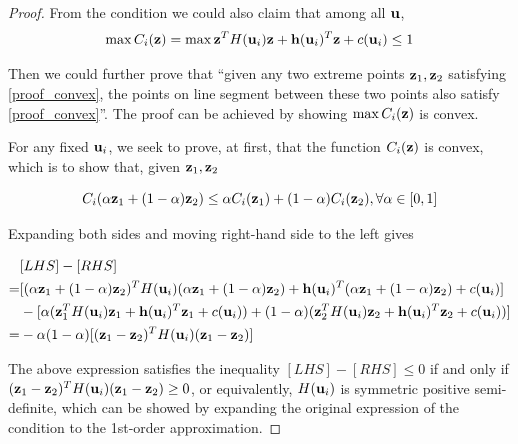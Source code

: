\documentclass{article}
\begin{document}
\begin{proof}
	From the condition we could also claim that among all ${\bf u}$,
	\begin{equation}
	\label{proof_convex}
	\max C_i({\bf z}) = \max {\bf z}^T H({\bf u}_i) {\bf z} + {\bf h}({\bf u}_i)^T {\bf z} + c({\bf u}_i) \leq 1
	\end{equation}
	
	Then we could further prove that ``given any two extreme points ${\bf z}_1, {\bf z}_2$ satisfying \eqref{proof_convex}, the points on line segment between these two points also satisfy \eqref{proof_convex}''. The proof can be achieved by showing $\max C_i({\bf z})$ is convex.
	
	For any fixed ${\bf u}_i$, we seek to prove, at first, that the function $C_i({\bf z})$ is convex, which is to show that, given ${\bf z}_1, {\bf z}_2$
	
	\begin{equation}
	\label{proof_convex_ineq}
	C_i(\alpha {\bf z}_1 + (1-\alpha) {\bf z}_2) \leq \alpha C_i({\bf z}_1) + (1-\alpha) C_i({\bf z}_2),  \forall  \alpha \in [0,1]
	\end{equation}
	
	Expanding both sides and moving right-hand side to the left gives
	
	\begin{equation}
	\label{proof_convex_each}
	\begin{aligned}
	& [LHS]-[RHS] \\
	=& [(\alpha {\bf z}_1 + (1-\alpha) {\bf z}_2)^T H({\bf u}_i) (\alpha {\bf z}_1 + (1-\alpha) {\bf z}_2) + {\bf h}({\bf u}_i)^T (\alpha {\bf z}_1 + (1-\alpha) {\bf z}_2) + c({\bf u}_i)]\\
	& - [\alpha ({\bf z}_1^T H({\bf u}_i) {\bf z}_1 + {\bf h}({\bf u}_i)^T {\bf z}_1 + c({\bf u}_i)) + (1-\alpha)({\bf z}_2^T H({\bf u}_i) {\bf z}_2 + {\bf h}({\bf u}_i)^T {\bf z}_2 + c({\bf u}_i))] \\
	=& -\alpha(1-\alpha) [({\bf z}_1 - {\bf z}_2)^T H({\bf u}_i) ({\bf z}_1 - {\bf z}_2)]
	\end{aligned}
	\end{equation}
	
	The above expression satisfies the inequality $[LHS]-[RHS] \leq 0$ if and only if $({\bf z}_1 - {\bf z}_2)^T H({\bf u}_i) ({\bf z}_1 - {\bf z}_2) \geq 0$, or equivalently, $H({\bf u}_i)$ is symmetric positive semi-definite, which can be showed by expanding the original expression of the condition to the 1st-order approximation.
	

\end{proof}
\end{document}

